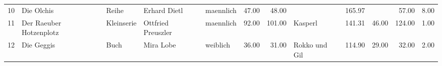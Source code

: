\begin{table}
\begin{center}
{\begin{tabular}{rllllrrlrrrr}
  10 & Die Olchis                                                                                                                                                                                                                                                      & Reihe & Erhard Dietl                                                                                                                                                                                                                                                    & maennlich & 47.00 & 48.00 &                                                                                                                                                                                                                                                                 & 165.97 &  & 57.00 & 8.00 \\ 
  11 & Der Raeuber Hotzenplotz                                                                                                                                                                                                                                         & Kleinserie & Ottfried Preuszler                                                                                                                                                                                                                                              & maennlich & 92.00 & 101.00 & Kasperl                                                                                                                                                                                                                                                         & 141.31 & 46.00 & 124.00 & 1.00 \\ 
  12 & Die Geggis                                                                                                                                                                                                                                                      & Buch & Mira Lobe                                                                                                                                                                                                                                                       & weiblich & 36.00 & 31.00 & Rokko und Gil                                                                                                                                                                                                                                                   & 114.90 & 29.00 & 32.00 & 2.00 \\ 

\end{tabular}}
\end{center}
\end{table}
